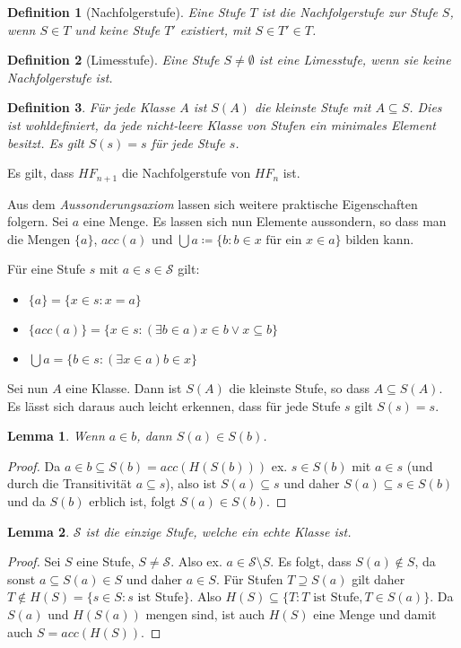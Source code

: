 \documentclass[german]{article}
\theoremstyle{break}
\theoremstyle{def_style}
\newtheorem{definition}{Definition}[section]
\theoremstyle{def_style}
\theoremstyle{lemma_style}
\newtheorem{lemma}{Lemma}[subsection]
\begin{document}
\begin{definition}[Nachfolgerstufe]
	Eine Stufe $T$ ist die \textit{Nachfolgerstufe} zur Stufe $S$, wenn $S\in T$ und keine Stufe $T'$ existiert, mit $S\in T'\in T$.
\end{definition}

\begin{definition}[Limesstufe]
	Eine Stufe $S\neq \emptyset$ ist eine \textit{Limesstufe}, wenn sie keine Nachfolgerstufe ist.
\end{definition}

\begin{definition}
	Für jede Klasse $A$ ist $S(A)$ die kleinste Stufe mit $A\subseteq S$. Dies ist wohldefiniert, da jede nicht-leere Klasse von Stufen ein minimales Element besitzt. Es gilt $S(s)=s$ für jede Stufe $s$.
\end{definition}

Es gilt, dass $HF_{n+1}$ die Nachfolgerstufe von $HF_n$ ist.

Aus dem \textit{Aussonderungsaxiom} lassen sich weitere praktische Eigenschaften folgern. Sei $a$ eine Menge. Es lassen sich nun Elemente aussondern, so dass man die Mengen $\{a\}$, $acc(a)$ und $\bigcup a\coloneqq\{b : b\in x\text{ für ein } x \in a\}$ bilden kann.

Für eine Stufe $s$ mit $a\in s \in \mathcal{S}$ gilt:
\begin{itemize}
	\item $\{a\}=\{x\in s : x=a\}$
	\item $\{acc(a)\}=\{x\in s: (\exists b\in a)x\in b \lor x\subseteq b\}$
	\item $\bigcup a=\{b\in s : (\exists x\in a)b\in x\}$
\end{itemize}

Sei nun $A$ eine Klasse. Dann ist $S(A)$ die kleinste Stufe, so dass $A\subseteq S(A)$. Es lässt sich daraus auch leicht erkennen, dass für jede Stufe $s$ gilt $S(s)=s$.

\begin{lemma}
	Wenn $a\in b$, dann $S(a)\in S(b)$.
\end{lemma}
\begin{proof}
	Da $a\in b \subseteq S(b)=acc(H(S(b)))$ ex. $s\in S(b)$ mit $a\in s$ (und durch die Transitivität $a\subseteq s$), also ist $S(a)\subseteq s$ und daher $S(a)\subseteq s \in S(b)$ und da $S(b)$ erblich ist, folgt $S(a)\in S(b)$.
\end{proof}

\begin{lemma}
	$\mathcal{S}$ ist die einzige Stufe, welche ein echte Klasse ist.
	\label{EinzigeStufeDieKlasseIst}
\end{lemma}
\begin{proof}
	Sei $S$ eine Stufe, $S\neq \mathcal{S}$. Also ex. $a\in \mathcal{S}\setminus S$. Es folgt, dass $S(a)\notin S$, da sonst $a\subseteq S(a)\in S$ und daher $a\in S$. 
	Für Stufen $T \supseteq S(a)$ gilt daher $T \notin H(S)=\{s\in S : s \text{ ist Stufe}\}$. Also $H(S)\subseteq\{T : T \text{ ist Stufe}, T \in S(a)\}$. Da $S(a)$ und $H(S(a))$ mengen sind, ist auch $H(S)$ eine Menge und damit auch $S=acc(H(S))$.
\end{proof}
\end{document}
